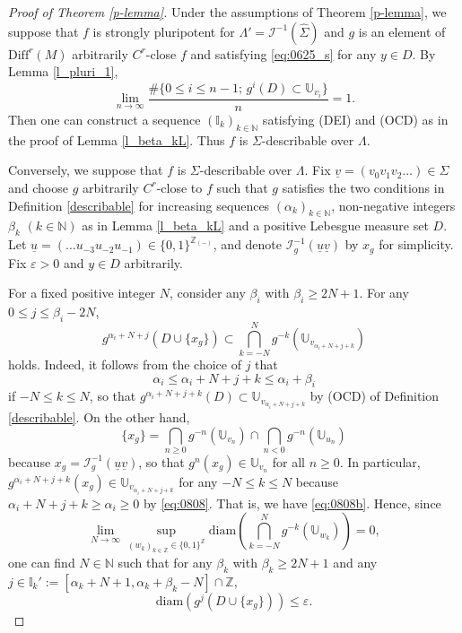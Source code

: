 \documentclass{amsart}
\theoremstyle{definition}
\numberwithin{equation}{section}
\numberwithin{figure}{section}
\begin{document}
\begin{proof}[Proof of Theorem \ref{p-lemma}]
Under the assumptions of Theorem \ref{p-lemma}, we suppose that $f$ is strongly pluripotent for $\Lambda'=\mathcal{I}^{-1}(\widehat\Sigma)$ and $g$ is an element of $\mathrm{Diff}^r(M)$ arbitrarily $C^r$-close $f$ and satisfying 
\eqref{eq:0625_s} for any $y\in D$.
By Lemma \ref{l_pluri_1}, 
$$
\lim_{n\rightarrow \infty}
\frac{\#\bigl\{0\leq i\leq n-1;\, g^i(D)\subset {\mathbb{U}}_{v_i}\bigr\}}{n}=1.
$$
Then one can construct a sequence $({\mathbb{I}}_k)_{k\in\mathbb{N}}$ satisfying (DEI) and (OCD) as in the proof of Lemma \ref{l_beta_kL}.
Thus $f$ is $\Sigma$-describable over $\Lambda$.


Conversely, we suppose that $f$ is $\Sigma$-describable over $\Lambda$. 
Fix $\underline v=(v_0v_1v_2\dots)\in \Sigma$ and choose $g$  arbitrarily $C^{r}$-close to $f$ such that $g$ satisfies the two conditions in Definition \ref{describable}  for increasing sequences $(\alpha _k)_{k\in \mathbb N}$, 
non-negative integers $\beta _k$ $(k\in \mathbb N)$ as in Lemma \ref{l_beta_kL} and a positive Lebesgue measure set $D$.
Let $\underline u=(\ldots u_{-3} u_{-2} u_{-1})\in \{0,1\}^{\mathbb{Z}_{(-)}}$, and denote 
$\mathcal I_g^{-1}(\underline u \underline v)$ by $x_g$ for simplicity. 
Fix $\varepsilon >0$ and $y\in D$ arbitrarily.




For a fixed positive integer $N$, consider any $\beta_i$ with $\beta_i\geq 2N+1$.
For any $0\le j\le \beta _i- 2N$, 
\begin{equation}\label{eq:0808b}
g^{\alpha _i + N+ j}(D \cup \{x_g\})\subset \bigcap _{k=- N}^{N} g^{-k}(\mathbb U_{v_{\alpha _i +N+j+k}})
\end{equation}
holds.
Indeed, it follows from  the choice of $j$ that 
\begin{equation}\label{eq:0808}
\alpha _i \le \alpha _i + N+ j+k \le \alpha _i+\beta _i
\end{equation}
if $-N\le k\le N$, so that $g^{\alpha _i + N+ j+k}(D)\subset \mathbb U_{v_{\alpha _i +N+j+k}}$ by 
(OCD) of Definition \ref{describable}. 
On the other hand, 
$$\{x_g\} = \bigcap _{n\ge 0}g^{-n} (\mathbb U_{v_{n}}) \cap \bigcap _{n<0} g^{-n} (\mathbb U_{u_{n}})$$
because $x_g=\mathcal I_g^{-1}(\underline u \underline v)$, 
so that $g^n(x_g)\in \mathbb U_{v_{n}}$ for all $n\ge 0$.
In particular, $g^{\alpha _i + N +j +k}(x_g)\in  \mathbb U_{v_{\alpha _i +N+j+k}}$ for any $-N\le k\le N$ because $\alpha _i +N+j+k \ge \alpha _i\ge 0$ by \eqref{eq:0808}. 
 That is, we have \eqref{eq:0808b}.  
Hence, since 
\[
 \lim _{N\rightarrow \infty} \sup _{(w_k)_{k\in \mathbb Z}\in \{0,1\}^{\mathbb Z}} \mathrm{diam}\left(\bigcap _{k=- N}^{N} g^{-k}(\mathbb U_{w_{k}})\right)  =0,
\]
 one can find $N\in \mathbb N$ such that for any $\beta_k$ with $\beta _k \ge  2N+1$ 
 and 
 any $j\in \mathbb I_k':=[\alpha_k +N+1, \alpha _k +\beta _k -N]\cap \mathbb{Z}$,
\begin{equation}\label{eq:1103}
\mathrm{diam}(g^j(D \cup \{ x_g\})) \leq \varepsilon.
\end{equation}






\end{proof}
\end{document}
